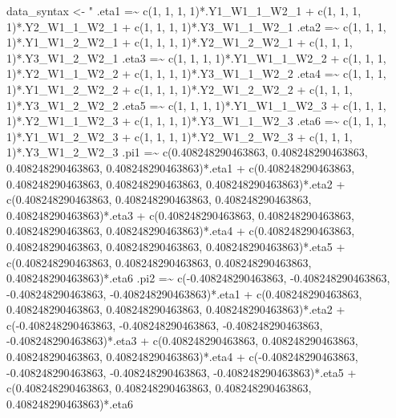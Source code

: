 \documentclass[
]{book}
\newenvironment{Shaded}{\begin{snugshade}}{\end{snugshade}}
\newcommand{\NormalTok}[1]{#1}
\newcommand{\OtherTok}[1]{\textcolor[rgb]{0.56,0.35,0.01}{#1}}
\newcommand{\StringTok}[1]{\textcolor[rgb]{0.31,0.60,0.02}{#1}}
\begin{document}
\begin{Shaded}
\begin{Highlighting}[]
\NormalTok{data\_syntax }\OtherTok{\textless{}{-}} \StringTok{"}
\StringTok{.eta1 =\textasciitilde{}}
\StringTok{    c(1, 1, 1, 1)*.Y1\_W1\_1\_W2\_1 +}
\StringTok{    c(1, 1, 1, 1)*.Y2\_W1\_1\_W2\_1 +}
\StringTok{    c(1, 1, 1, 1)*.Y3\_W1\_1\_W2\_1}
\StringTok{.eta2 =\textasciitilde{}}
\StringTok{    c(1, 1, 1, 1)*.Y1\_W1\_2\_W2\_1 +}
\StringTok{    c(1, 1, 1, 1)*.Y2\_W1\_2\_W2\_1 +}
\StringTok{    c(1, 1, 1, 1)*.Y3\_W1\_2\_W2\_1}
\StringTok{.eta3 =\textasciitilde{}}
\StringTok{    c(1, 1, 1, 1)*.Y1\_W1\_1\_W2\_2 +}
\StringTok{    c(1, 1, 1, 1)*.Y2\_W1\_1\_W2\_2 +}
\StringTok{    c(1, 1, 1, 1)*.Y3\_W1\_1\_W2\_2}
\StringTok{.eta4 =\textasciitilde{}}
\StringTok{    c(1, 1, 1, 1)*.Y1\_W1\_2\_W2\_2 +}
\StringTok{    c(1, 1, 1, 1)*.Y2\_W1\_2\_W2\_2 +}
\StringTok{    c(1, 1, 1, 1)*.Y3\_W1\_2\_W2\_2}
\StringTok{.eta5 =\textasciitilde{}}
\StringTok{    c(1, 1, 1, 1)*.Y1\_W1\_1\_W2\_3 +}
\StringTok{    c(1, 1, 1, 1)*.Y2\_W1\_1\_W2\_3 +}
\StringTok{    c(1, 1, 1, 1)*.Y3\_W1\_1\_W2\_3}
\StringTok{.eta6 =\textasciitilde{}}
\StringTok{    c(1, 1, 1, 1)*.Y1\_W1\_2\_W2\_3 +}
\StringTok{    c(1, 1, 1, 1)*.Y2\_W1\_2\_W2\_3 +}
\StringTok{    c(1, 1, 1, 1)*.Y3\_W1\_2\_W2\_3}
\StringTok{.pi1 =\textasciitilde{}}
\StringTok{    c(0.408248290463863, 0.408248290463863, 0.408248290463863, 0.408248290463863)*.eta1 +}
\StringTok{    c(0.408248290463863, 0.408248290463863, 0.408248290463863, 0.408248290463863)*.eta2 +}
\StringTok{    c(0.408248290463863, 0.408248290463863, 0.408248290463863, 0.408248290463863)*.eta3 +}
\StringTok{    c(0.408248290463863, 0.408248290463863, 0.408248290463863, 0.408248290463863)*.eta4 +}
\StringTok{    c(0.408248290463863, 0.408248290463863, 0.408248290463863, 0.408248290463863)*.eta5 +}
\StringTok{    c(0.408248290463863, 0.408248290463863, 0.408248290463863, 0.408248290463863)*.eta6}
\StringTok{.pi2 =\textasciitilde{}}
\StringTok{    c({-}0.408248290463863, {-}0.408248290463863, {-}0.408248290463863, {-}0.408248290463863)*.eta1 +}
\StringTok{    c(0.408248290463863, 0.408248290463863, 0.408248290463863, 0.408248290463863)*.eta2 +}
\StringTok{    c({-}0.408248290463863, {-}0.408248290463863, {-}0.408248290463863, {-}0.408248290463863)*.eta3 +}
\StringTok{    c(0.408248290463863, 0.408248290463863, 0.408248290463863, 0.408248290463863)*.eta4 +}
\StringTok{    c({-}0.408248290463863, {-}0.408248290463863, {-}0.408248290463863, {-}0.408248290463863)*.eta5 +}
\StringTok{    c(0.408248290463863, 0.408248290463863, 0.408248290463863, 0.408248290463863)*.eta6}

\end{Highlighting}
\end{Shaded}
\end{document}
